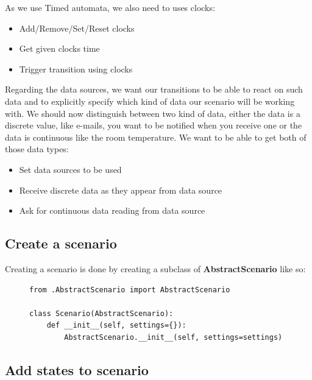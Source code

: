 \documentclass[12pt]{article}
\theoremstyle{definition}
\theoremstyle{definition}
\theoremstyle{remark}
\begin{document}
As we use Timed automata, we also need to uses clocks:

\begin{itemize}
\item Add/Remove/Set/Reset clocks
\item Get given clocks time
\item Trigger transition using clocks
\end{itemize}

Regarding the data sources, we want our transitions to be able to react on such data and to explicitly specify which kind of data our scenario will be working with. We should now distinguish between two kind of data, either the data is a discrete value, like e-mails, you want to be notified when you receive one or the data is continuous like the room temperature. We want to be able to get both of those data types:

\begin{itemize}
\item Set data sources to be used
\item Receive discrete data as they appear from data source
\item Ask for continuous data reading from data source
\end{itemize}


\subsection{Create a scenario}

Creating a scenario is done by creating a subclass of \textbf{AbstractScenario} like so:

\begin{figure}[H]
    \begin{lstlisting}[caption="Creating a scenario",label={lst:python-create-scenario}]
from .AbstractScenario import AbstractScenario

class Scenario(AbstractScenario):
    def __init__(self, settings={}):
        AbstractScenario.__init__(self, settings=settings)
    \end{lstlisting}
\end{figure}


\subsection{Add states to scenario}
\end{document}
